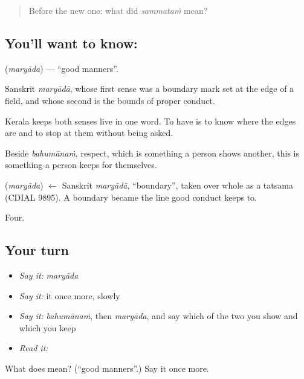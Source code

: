 \begin{quote}
Before the new one: what did \emph{sammataṁ} mean?
\end{quote}

\subsection*{You'll want to know: }
\textbf{} (\emph{maryāda}) — \textquotedblleft{}good manners\textquotedblright{}.

Sanskrit \emph{maryādā}, whose first sense was a boundary mark set at the edge of a field, and whose second is the bounds of proper conduct.

Kerala keeps both senses live in one word. To have  is to know where the edges are and to stop at them without being asked.

Beside \emph{bahumānaṁ}, respect, which is something a person shows another, this is something a person keeps for themselves.

\begin{cousinweb}
\textbf{} (\emph{maryāda}) $\leftarrow$ Sanskrit \emph{maryādā}, \textquotedblleft{}boundary\textquotedblright{}, taken over whole as a tatsama (CDIAL 9895). A boundary became the line good conduct keeps to.
\end{cousinweb}

\begin{grammarlens}[title={What you've built}]
Four.
\end{grammarlens}

\subsection*{Your turn}
\begin{itemize}
\raggedright
  \item \emph{Say it:} \emph{maryāda}
  \item \emph{Say it:} it once more, slowly
  \item \emph{Say it:} \emph{bahumānaṁ}, then \emph{maryāda}, and say which of the two you show and which you keep
  \item \emph{Read it:} \textbf{}
\end{itemize}

\begin{tcolorbox}[breakable,colback=teal!4,colframe=teal!35!black,title={Before you move on}]
What does  mean? (\textquotedblleft{}good manners\textquotedblright{}.) Say it once more.
\end{tcolorbox}
